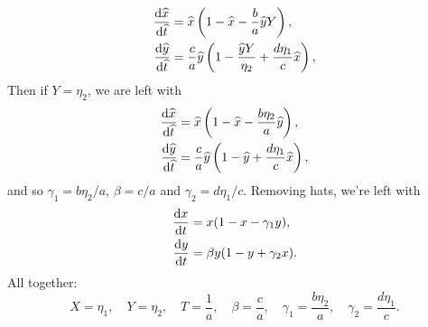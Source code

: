 \documentclass[a4paper,12pt]{article}
\begin{document}
\begin{enumerate}
{\begin{subequations}
\begin{align}
    	\fd{\hat{x}}{\hat{t}} &= \hat{x}\left(1-\hat{x} - \frac{b}{a}\hat{y}Y\right),\\
		\fd{\hat{y}}{\hat{t}} &= \frac{c}{a}\hat{y}\left(1-\frac{\hat{y}Y}{\eta_2} + \frac{d\eta_1}{c}\hat{x}\right),
    \end{align}
    \end{subequations}    
	Then if $Y=\eta_2$, we are left with
	\begin{subequations}
    \begin{align}
    	\fd{\hat{x}}{\hat{t}} &= \hat{x}\left(1-\hat{x} - \frac{b\eta_2}{a}\hat{y}\right),\\
		\fd{\hat{y}}{\hat{t}} &= \frac{c}{a}\hat{y}\left(1-\hat{y} + \frac{d\eta_1}{c}\hat{x}\right),
    \end{align}
    \end{subequations}  	
    and so $\gamma_1 = b\eta_2/a$, $\beta=c/a$ and $\gamma_2=d\eta_1/c$. Removing hats, we're left with
   	\begin{subequations}
    \begin{align}
    	\fd{x}{t} &= x(1-x - \gamma_1 y),\\
		\fd{y}{t} &= \beta y(1-y + \gamma_2 x).
    \end{align}
    \end{subequations}
    All together:
    \begin{equation}
    	X=\eta_1, \quad Y=\eta_2, \quad T=\frac1a, \quad \beta=\frac{c}{a}, \quad \gamma_1 = \frac{b\eta_2}{a}, \quad \gamma_2 = \frac{d\eta_1}{c}.
    \end{equation}    
    }    
    

\end{enumerate}
\end{document}

